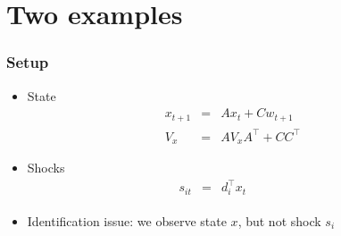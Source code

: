 \documentclass{beamer}
\begin{document}

\section{Two examples}
\begin{frame}
\frametitle{Setup}
\begin{itemize} \itemsep=\bigskipamount
\item State
\begin{eqnarray*}
    x_{t+1} &=& A x_t + C w_{t+1} \phantom{} \phantom{\sum_X} \\
       V_x  &=& A V_x A^\top + C C^\top
\end{eqnarray*}
\item Shocks
\begin{eqnarray*}
    s_{it} &=& d_i^\top x_t \phantom{xxxxi} \phantom{\sum_X}
\end{eqnarray*}
\item Identification issue:  we observe state $x$, but not shock $s_i$
\end{itemize}
\end{frame}
\end{document}
